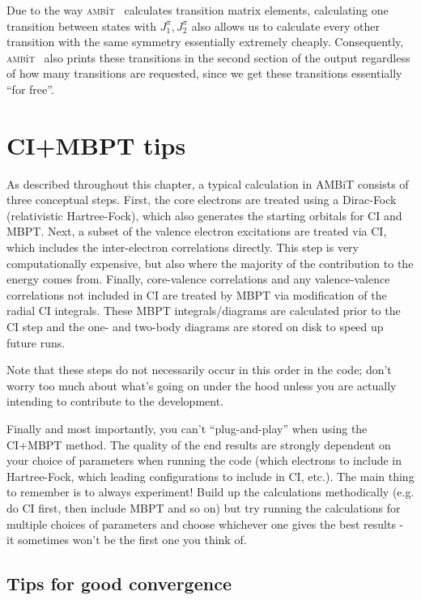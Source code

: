 \documentclass{report}
\newcommand{\ambit}{\textsc{amb}{\footnotesize i}\textsc{t}}
\begin{document}
Due to the way \ambit~ calculates transition matrix elements, calculating one transition between states
with $J^{\pi}_1, J^{\pi}_2$ also allows us to calculate every other transition with the same 
symmetry essentially extremely cheaply. Consequently, \ambit~ also prints these transitions in the 
second section of the output regardless of how many transitions are requested, since we get these
transitions essentially ``for free''.

\section{CI+MBPT tips}
\label{sec:CI_tips}

As described throughout this chapter, a typical calculation in AMBiT consists of three conceptual steps.
First, the core electrons are treated using a Dirac-Fock (relativistic
Hartree-Fock), which also generates the starting orbitals for CI and
MBPT. Next, a subset of the valence electron excitations are treated via
CI, which includes the inter-electron correlations directly. This step
is very computationally expensive, but also where the majority of the
contribution to the energy comes from. Finally, core-valence
correlations and any valence-valence correlations not included in CI are
treated by MBPT via modification of the radial CI integrals. These MBPT
integrals/diagrams are calculated prior to the CI step and the one- and
two-body diagrams are stored on disk to speed up future runs.

Note that these steps do not necessarily occur in this order in
the code; don't worry too much about what's going on under the hood
unless you are actually intending to contribute to the development.

Finally and most importantly, you can't ``plug-and-play'' when using the CI+MBPT method. The quality of 
the end results are strongly
dependent on your choice of parameters when running the code (which
electrons to include in Hartree-Fock, which leading configurations to
include in CI, etc.). The main thing to remember is to always
experiment! Build up the calculations methodically (e.g. do CI first,
then include MBPT and so on) but try running the calculations for
multiple choices of parameters and choose whichever one gives the best
results - it sometimes won't be the first one you think of.

\subsection{Tips for good convergence}
\end{document}
